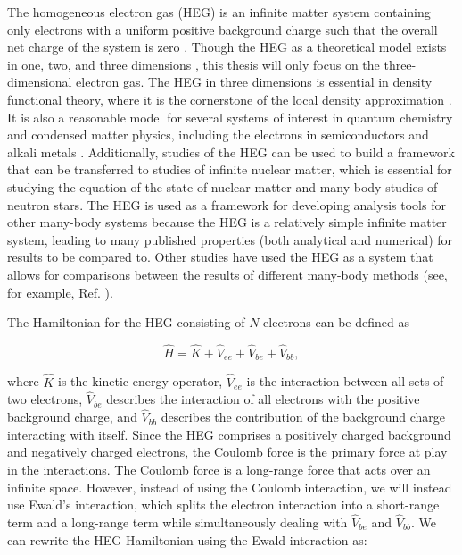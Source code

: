 The homogeneous electron gas (HEG) is an infinite matter system containing only electrons with a uniform positive background charge such that the overall net charge of the system is zero \cite{Ref4}. Though the HEG as a theoretical model exists in one, two, and three dimensions \cite{Ref4}, this thesis will only focus on the three-dimensional electron gas. The HEG in three dimensions is essential in density functional theory, where it is the cornerstone of the local density approximation \cite{Ref4}. It is also a reasonable model for several systems of interest in quantum chemistry and condensed matter physics, including the electrons in semiconductors and alkali metals \cite{Ref4}. Additionally, studies of the HEG can be used to build a framework that can be transferred to studies of infinite nuclear matter, which is essential for studying the equation of the state of nuclear matter and many-body studies of neutron stars. The HEG is used as a framework for developing analysis tools for other many-body systems because the HEG is a relatively simple infinite matter system, leading to many published properties (both analytical and numerical) for results to be compared to. Other studies have used the HEG as a system that allows for comparisons between the results of different many-body methods (see, for example, Ref. \cite{Ref4}).

The Hamiltonian for the HEG consisting of $N$ electrons can be defined as

\begin{equation}
    \hat{H} = \hat{K} + \hat{V}_{ee} + \hat{V}_{be} + \hat{V}_{bb},
\end{equation}

where $\hat{K}$ is the kinetic energy operator, $\hat{V}_{ee}$ is the interaction between all sets of two electrons, $\hat{V}_{be}$ describes the interaction of all electrons with the positive background charge, and $\hat{V}_{bb}$ describes the contribution of the background charge interacting with itself. Since the HEG comprises a positively charged background and negatively charged electrons, the Coulomb force is the primary force at play in the interactions. The Coulomb force is a long-range force that acts over an infinite space. However, instead of using the Coulomb interaction, we will instead use Ewald's interaction, which splits the electron interaction into a short-range term and a long-range term while simultaneously dealing with $\hat{V}_{be}$ and $\hat{V}_{bb}$. We can rewrite the HEG Hamiltonian using the Ewald interaction as:

